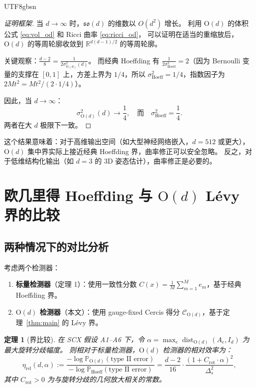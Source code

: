 \documentclass[12pt,a4paper]{article}
\theoremstyle{plain}
\newtheorem{theorem}{定理}[section]
\theoremstyle{definition}
\theoremstyle{remark}
\newcommand{\R}{\mathbb{R}}
\newcommand{\Pbb}{\mathbb{P}}
\newcommand{\Od}{\mathrm{O}(d)}
\newcommand{\sod}{\mathfrak{so}(d)}
\newcommand{\cercis}{\mathcal{C}}
\DeclareMathOperator{\dist}{dist}
\begin{document}
\begin{CJK}{UTF8}{gbsn}
\begin{proof}[证明框架]
当 $d \to \infty$ 时，$\sod$ 的维数以 $O(d^2)$ 增长。
利用 $\Od$ 的体积公式 \eqref{eq:vol_od} 和 Ricci 曲率 \eqref{eq:ricci_od}，
可以证明在适当的重缩放后，$\Od$ 的等周轮廓收敛到 $\R^{d(d-1)/2}$ 的等周轮廓。

关键观察：$\frac{d-2}{8} = \frac{1}{2\sigma_{\Od}^2(d)}$。
而经典 Hoeffding 有 $\frac{1}{2\sigma_{\text{Hoeff}}^2} = 2$（因为 Bernoulli 变量的支撑在 $[0,1]$ 上，方差上界为 $1/4$，所以 $\sigma_{\text{Hoeff}}^2 = 1/4$，指数因子为 $2M t^2 = M t^2 / (2 \cdot 1/4)$）。

因此，当 $d \to \infty$：
\begin{equation}
    \sigma_{\Od}^2(d) \to \frac{1}{4}, \quad \text{而} \quad \sigma_{\text{Hoeff}}^2 = \frac{1}{4}.
\end{equation}
两者在大 $d$ 极限下一致。
\end{proof}

这个结果意味着：对于高维输出空间（如大型神经网络嵌入，$d = 512$ 或更大），
$\Od$ 集中界实际上接近经典 Hoeffding 界，曲率修正可以安全忽略。
反之，对于低维结构化输出（如 $d=3$ 的 3D 姿态估计），曲率修正是必要的。

\newpage

\section{欧几里得 Hoeffding 与 $\Od$ Lévy 界的比较}

\subsection{两种情况下的对比分析}

考虑两个检测器：

\begin{enumerate}
    \item \textbf{标量检测器}（定理 1）：使用一致性分数 $C(x) = \frac{1}{M}\sum_{m=1}^M e_m$，基于经典 Hoeffding 界。
    \item \textbf{$\Od$ 检测器}（本文）：使用 gauge-fixed Cercis 得分 $\cercis_{\Od}$，基于定理~\ref{thm:main} 的 Lévy 界。
\end{enumerate}

\begin{theorem}[界比较]\label{thm:comparison}
在 SCX 假设 A1--A6 下，令 $\alpha = \max_{e} \dist_{\Od}(A_e, I_d)$ 为最大旋转分歧幅度。
则相对于标量检测器，$\Od$ 检测器的相对效率为：
\begin{equation}
    \eta_{\text{rel}}(d, \alpha) := \frac{-\log \Pbb_{\Od}(\text{type II error})}{-\log \Pbb_{\text{Hoeff}}(\text{type II error})}
    = \frac{d-2}{16} \cdot \frac{(1 + C_{\text{rot}} \cdot \alpha)^2}{\Delta_s^2},
\end{equation}
其中 $C_{\text{rot}} > 0$ 为与旋转分歧的几何放大相关的常数。
\end{theorem}


\end{CJK}
\end{document}
